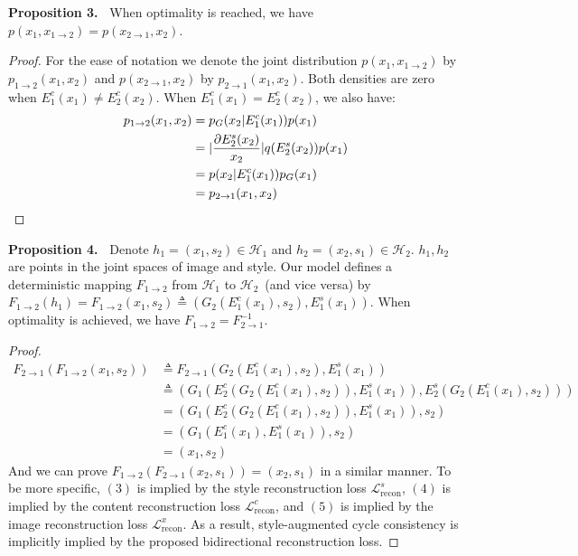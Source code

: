 \documentclass[runningheads]{llncs}
\newcommand{\oneshot}[2]{\noindent\textbf{Proposition {#1}.\ }{#2}}
\begin{document}
\oneshot{3}{
	When optimality is reached,  we have
	$p(x_{1}, x_{1\rightarrow 2}) = p(x_{2\rightarrow 1}, x_{2})$.
}

	\begin{proof}
		For the ease of notation we denote the joint distribution $p(x_{1}, x_{1\rightarrow 2})$ by $	p_{1\rightarrow 2}(x_{1}, x_{2})$ and $p(x_{2\rightarrow 1}, x_{2})$ by $	p_{2\rightarrow 1}(x_{1}, x_{2})$. Both densities are zero when $E_{1}^{c}(x_{1}) \neq E_{2}^{c}(x_{2})$. When $E_{1}^{c}(x_{1}) = E_{2}^{c}(x_{2})$, we also have:
		\begin{align}
		p_{1\rightarrow 2}(x_{1}, x_{2}) &= p_{G}(x_{2}|E^{c}_{1}(x_{1}))p(x_{1})\notag\\
		&= \lvert \frac{\partial E^{s}_2(x_{2})}{x_{2}} \rvert q(E^{s}_{2}(x_{2}))p(x_{1})\notag\\
		&= p(x_{2}|E^{c}_{1}(x_{1}))p_{G}(x_{1})\notag\\
		&= p_{2\rightarrow 1}(x_{1}, x_{2})\notag
		\end{align}
	\end{proof}


\oneshot{4}{
	Denote $h_{1}=(x_{1}, s_{2})\in \mathcal{H}_{1}$ and $h_{2}=(x_{2}, s_{1})\in \mathcal{H}_{2}$. $h_{1}, h_{2}$ are points in the joint spaces of image and style. Our model defines a deterministic mapping $F_{1\rightarrow 2}$ from $\mathcal{H}_{1}$ to $\mathcal{H}_{2}$~(and vice versa) by $F_{1\rightarrow 2}(h_{1}) = F_{1\rightarrow 2}(x_{1}, s_{2})\triangleq(G_{2}(E^{c}_{1}(x_{1}), s_{2}), E^{s}_{1}(x_{1}))$. When optimality is achieved, we have $F_{1\rightarrow 2} = F_{2\rightarrow 1}^{-1}$.
}

	\begin{proof}
		\begin{align}
		F_{2\rightarrow 1}(F_{1\rightarrow 2}(x_{1}, s_{2})) &\triangleq F_{2\rightarrow 1}(G_{2}(E^{c}_{1}(x_{1}), s_{2}), E^{s}_{1}(x_{1}))\\ 
		&\triangleq (G_{1}(E^{c}_{2}(G_{2}(E^{c}_{1}(x_{1}), s_{2})), E^{s}_{1}(x_{1})), E^{s}_{2}(G_{2}(E^{c}_{1}(x_{1}), s_{2})))\\
		&= (G_{1}(E^{c}_{2}(G_{2}(E^{c}_{1}(x_{1}), s_{2})), E^{s}_{1}(x_{1})), s_{2})\\
		&= (G_{1}(E^{c}_{1}(x_{1}), E^{s}_{1}(x_{1})), s_{2})\\
		&= (x_{1}, s_{2})
		\end{align}
		And we can prove $F_{1\rightarrow 2}(F_{2\rightarrow 1}(x_{2}, s_{1})) = (x_{2}, s_{1})$ in a similar manner. To be more specific, $(3)$ is implied by the style reconstruction loss $\mathcal{L}^{s}_{\text{recon}}$, $(4)$ is implied by the content reconstruction loss $\mathcal{L}^{c}_{\text{recon}}$, and $(5)$ is implied by the image reconstruction loss $\mathcal{L}^{x}_{\text{recon}}$. As a result, style-augmented cycle consistency is implicitly implied by the proposed bidirectional reconstruction loss.
	\end{proof}
\end{document}
